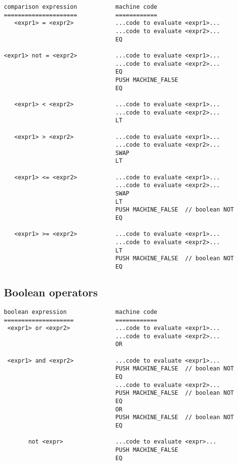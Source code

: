 \documentclass[11pt]{article}
\begin{document}
\begin{verbatim}
comparison expression           machine code
=====================           ============
   <expr1> = <expr2>            ...code to evaluate <expr1>...
                                ...code to evaluate <expr2>...
                                EQ

<expr1> not = <expr2>           ...code to evaluate <expr1>...
                                ...code to evaluate <expr2>...
                                EQ
                                PUSH MACHINE_FALSE
                                EQ

   <expr1> < <expr2>            ...code to evaluate <expr1>...
                                ...code to evaluate <expr2>...
                                LT

   <expr1> > <expr2>            ...code to evaluate <expr1>...
                                ...code to evaluate <expr2>...
                                SWAP
                                LT

   <expr1> <= <expr2>           ...code to evaluate <expr1>...
                                ...code to evaluate <expr2>...
                                SWAP
                                LT
                                PUSH MACHINE_FALSE  // boolean NOT
                                EQ

   <expr1> >= <expr2>           ...code to evaluate <expr1>...
                                ...code to evaluate <expr2>...
                                LT
                                PUSH MACHINE_FALSE  // boolean NOT
                                EQ
\end{verbatim}

\subsection{Boolean operators}

\begin{verbatim}
boolean expression              machine code
====================            ============
 <expr1> or <expr2>             ...code to evaluate <expr1>...
                                ...code to evaluate <expr2>...
                                OR

 <expr1> and <expr2>            ...code to evaluate <expr1>...
                                PUSH MACHINE_FALSE  // boolean NOT
                                EQ
                                ...code to evaluate <expr2>...
                                PUSH MACHINE_FALSE  // boolean NOT
                                EQ
                                OR
                                PUSH MACHINE_FALSE  // boolean NOT
                                EQ

       not <expr>               ...code to evaluate <expr>...
                                PUSH MACHINE_FALSE
                                EQ
\end{verbatim}
\end{document}
